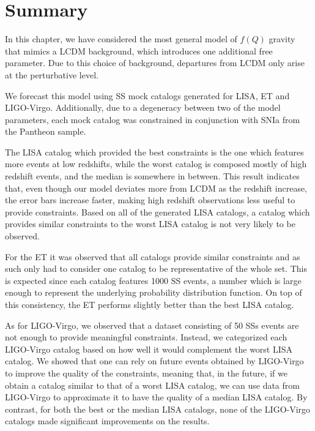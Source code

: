 \section{Summary}
\label{sec:STG-LCDM-bg-summary}

In this chapter, we have considered the most general model of $f(Q)$ gravity that mimics a \gls{LCDM} background, which introduces one additional free parameter. Due to this choice of background, departures from \gls{LCDM} only arise at the perturbative level.

We forecast this model using \gls{SS} mock catalogs generated for \gls{LISA}, \gls{ET} and \gls{LIGO}-Virgo. Additionally, due to a degeneracy between two of the model parameters, each mock catalog was constrained in conjunction with \gls{SNIa} from the Pantheon sample.

The \gls{LISA} catalog which provided the best constraints is the one which features more events at low redshifts, while the worst catalog is composed mostly of high redshift events, and the median is somewhere in between. This result indicates that, even though our model deviates more from \gls{LCDM} as the redshift increase, the error bars increase faster, making high redshift observations less useful to provide constraints. Based on all of the generated \gls{LISA} catalogs, a catalog which provides similar constraints to the worst \gls{LISA} catalog is not very likely to be observed.

For the \gls{ET} it was observed that all catalogs provide similar constraints and as such only had to consider one catalog to be representative of the whole set. This is expected since each catalog features 1000 \gls{SS} events, a number which is large enough to represent the underlying probability distribution function. On top of this consistency, the \gls{ET} performs slightly better than the best \gls{LISA} catalog.

As for \gls{LIGO}-Virgo, we observed that a dataset consisting of 50 \glspl{SS} events are not enough to provide meaningful constraints. Instead, we categorized each \gls{LIGO}-Virgo catalog based on how well it would complement the worst \gls{LISA} catalog. We showed that one can rely on future events obtained by \gls{LIGO}-Virgo to improve the quality of the constraints, meaning that, in the future, if we obtain a catalog similar to that of a worst \gls{LISA} catalog, we can use data from \gls{LIGO}-Virgo to approximate it to have the quality of a median \gls{LISA} catalog. By contrast, for both the best or the median \gls{LISA} catalogs, none of the \gls{LIGO}-Virgo catalogs made significant improvements on the results.

